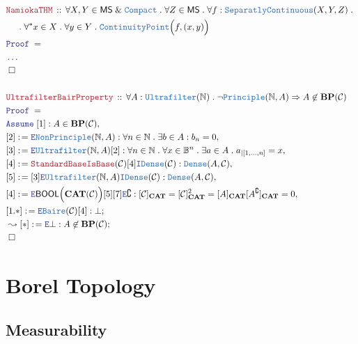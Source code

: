 \documentclass[12pt]{scrartcl}
\newcommand{\TYPE}[1]{\textcolor{NavyBlue}{\mathtt{#1}}}
\newcommand{\LOGIC}[1]{\textcolor{Blue}{\mathtt{#1}}}
\newcommand{\THM}[1]{\textcolor{Maroon}{\mathtt{#1}}}
\renewcommand{\.}{\; . \;}
\newcommand{\de}{: \kern 0.1pc =}
\newcommand{\Theorem}[2]{& \THM{#1} \, :: \, #2 \\ & \Proof = \\ }
\newcommand{\NewLine}{\\ & \kern 1pc}
\newcommand{\Page}[1]{ \begin{align*} #1 \end{align*}   }
\newcommand{\NoProof}{ & \ldots \\ \EndProof}
\renewcommand{\And}{\; \& \;}
\newcommand{\Imply}{\Rightarrow}
\newcommand{\Intro}{\LOGIC{I}}
\newcommand{\Elim}{\LOGIC{E}}
\newcommand{\Nat}{\mathbb{N} }
\renewcommand{\c}{\complement}
\newcommand{\Say}[3]{& #1 \de #2 : #3, \\}
\newcommand{\Conclude}[3]{& #1 \de #2 : #3; \\}
\newcommand{\DeriveConclude}[3]{& \leadsto #1 \de #2 : #3 ; \\}
\newcommand{\Assume}[2]{& \LOGIC{Assume} \; #1 : #2, \\}
\newcommand{\QED}{\; \square}
\newcommand{\EndProof}{& \QED \\}
\newcommand{\Proof}{\LOGIC{Proof} \; }
\newcommand{\C}{\mathcal{C}}
\newcommand{\Compact}{\TYPE{Compact}}
\newcommand{\Bair}{\TYPE{Baire}}
\newcommand{\MS}{\mathsf{MS}}
\newcommand{\Bool}{\mathbb{B}}
\newcommand{\BOOL}{\mathsf{BOOL}}
\newcommand{\BP}{\mathbf{BP}}
\newcommand{\cat}{\mathbf{CAT}}
\newcommand{\inits}[2]{{#1}_{|\left[1,\ldots,#2\right]}}
\begin{document}
\Page{
	\Theorem{NamiokaTHM}
	{
		\forall X,Y \in \MS \And \Compact \.
		\forall Z \in \MS \.
		\forall	f : \TYPE{SeparatlyContinuous}(X,Y,Z) \. \NewLine \.
		\forall^* x \in X \. \forall y \in Y \. \TYPE{ContinuityPoint}\Big(f,(x,y)\Big)
	}
	\NoProof
	\\
	\Theorem{UltrafilterBairProperty}
	{
		\forall A : \TYPE{Ultrafilter}(\Nat) \.
		\neg \TYPE{Principle}(\Nat,A)
		\Imply  
		A \not \in \BP(\C)
	}
	\Assume{[1]}{A \in \BP(\C)}
	\Say{[2]}
	{
		\Elim \TYPE{NonPrinciple}(\Nat,A)	
	}
	{
		\forall n \in \Nat \. \exists b \in A : b_n = 0
	}
	\Say{[3]}{\Elim \TYPE{Ultrafilter}(\Nat,A)[2]}
	{
		\forall n \in \Nat \.
		\forall x \in \Bool^n \.
		\exists a \in A \.
		\inits{a}{n} = x
	}
	\Say{[4]}{
		\THM{StandardBaseIsBase}(\C)[4]\Intro \TYPE{Dense}(\C)
	}
	{
		\TYPE{Dense}(A,\C)
	}
	\Say{[5]}
	{[3] \Elim \TYPE{Ultrafilter}(\Nat,A) \Intro \TYPE{Dense}(\C)}{\TYPE{Dense}(A,\C)}
	\Say{[4]}{\Elim \BOOL\Big(\cat(\C)\Big)[5][7] \Elim \c }
	{
		[\C]_\cat = [\C]^2_\cat =
		[A]_\cat[A^\c]_\cat = 0
	}
	\Conclude{[1.*]}{\Elim \Bair(\C)[4]}{\bot}
	\DeriveConclude{[*]}{\Elim \bot}{A \not \in \BP(\C)}
	\EndProof
}
\newpage
\section{Borel Topology}
\subsection{Measurability}
\end{document}
